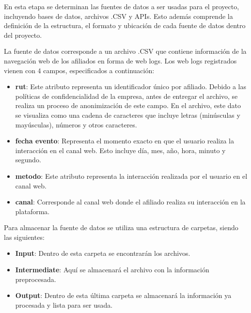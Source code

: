 En esta etapa se determinan las fuentes de datos a ser usadas para el proyecto, incluyendo bases de datos, archivos .CSV y APIs. Esto además comprende la definición de la estructura, el formato y ubicación de cada fuente de datos dentro del proyecto.

La fuente de datos corresponde a un archivo .CSV que contiene información de la navegación web de los afiliados en forma de web logs. Los web logs registrados vienen con 4 campos, especificados a continuación:

\begin{itemize}
\item \textbf{rut}: Este atributo representa un identificador único por afiliado. Debido a las políticas de confidencialidad de la empresa, antes de entregar el archivo, se realiza un proceso de anonimización de este campo. En el archivo, este dato se visualiza como una cadena de caracteres que incluye letras (minúsculas y mayúsculas), números y otros caracteres.
\item \textbf{fecha evento}: Representa el momento exacto en que el usuario realiza la interacción en el canal web. Esto incluye día, mes, año, hora, minuto y segundo.
\item \textbf{metodo}: Este atributo representa la interacción realizada por el usuario en el canal web.
\item \textbf{canal}: Corresponde al canal web donde el afiliado realiza su interacción en la plataforma.
\end{itemize}

Para almacenar la fuente de datos se utiliza una estructura de carpetas, siendo las siguientes:

\begin{itemize}
\item \textbf{Input}: Dentro de esta carpeta se encontrarán los archivos.
\item \textbf{Intermediate}: Aquí se almacenará el archivo con la información preprocesada.
\item \textbf{Output}: Dentro de esta última carpeta se almacenará la información ya procesada y lista para ser usada.
\end{itemize}